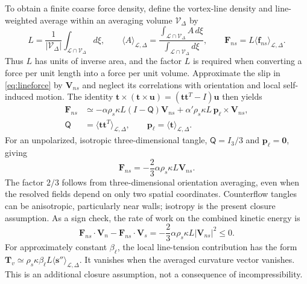 \documentclass[11pt]{article}
\numberwithin{equation}{section}
\begin{document}
To obtain a finite coarse force density, define the vortex-line density and line-weighted average within an averaging volume $\mathcal V_\Delta$ by
\begin{equation}
 L=\frac{1}{|\mathcal V_\Delta|}
      \int_{\mathcal L\cap\mathcal V_\Delta}d\xi,
 \qquad
 \langle A\rangle_{\mathcal L,\Delta}
 =\frac{\int_{\mathcal L\cap\mathcal V_\Delta}A\,d\xi}
        {\int_{\mathcal L\cap\mathcal V_\Delta}d\xi},
 \qquad
 \mathbf F_{ns}=L\langle\mathbf f_{ns}\rangle_{\mathcal L,\Delta}.
 \label{eq:linedensity}
\end{equation}
Thus $L$ has units of inverse area, and the factor $L$ is required when converting a force per unit length into a force per unit volume. Approximate the slip in \eqref{eq:lineforce} by $\mathbf V_{ns}$ and neglect its correlations with orientation and local self-induced motion. The identity $\mathbf t\times(\mathbf t\times\mathbf u)=(\mathbf t\mathbf t^T-I)\mathbf u$ then yields
\begin{equation}
 \begin{aligned}
 \mathbf F_{ns}&\simeq-\alpha\rho_s\kappa L
      (I-\mathsf Q)\mathbf V_{ns}
   +\alpha'\rho_s\kappa L\,\mathbf p_\ell\times\mathbf V_{ns},\\
 \mathsf Q&=\langle\mathbf t\mathbf t^T\rangle_{\mathcal L,\Delta},
 \qquad
 \mathbf p_\ell=\langle\mathbf t\rangle_{\mathcal L,\Delta}.
 \end{aligned}
 \label{eq:orientationclosure}
\end{equation}
For an unpolarized, isotropic three-dimensional tangle, $\mathsf Q=I_3/3$ and $\mathbf p_\ell=\mathbf0$, giving
\begin{equation}
 \boxed{\mathbf F_{ns}=-\frac23\alpha\rho_s\kappa L\mathbf V_{ns}}.
 \label{eq:isotropicfriction}
\end{equation}
The factor $2/3$ follows from three-dimensional orientation averaging, even when the resolved fields depend on only two spatial coordinates. Counterflow tangles can be anisotropic, particularly near walls; isotropy is the present closure assumption. As a sign check, the rate of work on the combined kinetic energy is
\begin{equation}
 \mathbf F_{ns}\cdot\mathbf V_n-\mathbf F_{ns}\cdot\mathbf V_s
 =-\frac23\alpha\rho_s\kappa L|\mathbf V_{ns}|^2\leq0.
 \label{eq:frictiondissipation}
\end{equation}
For approximately constant $\beta_\ell$, the local line-tension contribution has the form $\mathbf T_v\simeq\rho_s\kappa\beta_\ell L\langle\mathbf s''\rangle_{\mathcal L,\Delta}$. It vanishes when the averaged curvature vector vanishes. This is an additional closure assumption, not a consequence of incompressibility.
\end{document}
